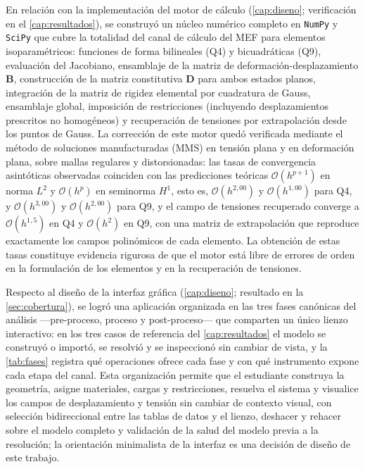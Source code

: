 En relación con la implementación del motor de cálculo (\autoref{cap:diseno}; verificación en el \autoref{cap:resultados}), se construyó un núcleo numérico completo en \texttt{NumPy} y \texttt{SciPy} que cubre la totalidad del canal de cálculo del MEF para elementos isoparamétricos: funciones de forma bilineales (Q4) y bicuadráticas (Q9), evaluación del Jacobiano, ensamblaje de la matriz de deformación-desplazamiento $\bm{B}$, construcción de la matriz constitutiva $\bm{D}$ para ambos estados planos, integración de la matriz de rigidez elemental por cuadratura de Gauss, ensamblaje global, imposición de restricciones (incluyendo desplazamientos prescritos no homogéneos) y recuperación de tensiones por extrapolación desde los puntos de Gauss. La corrección de este motor quedó verificada mediante el método de soluciones manufacturadas (MMS) en tensión plana y en deformación plana, sobre mallas regulares y distorsionadas: las tasas de convergencia asintóticas observadas coinciden con las predicciones teóricas $\mathcal{O}(h^{p+1})$ en norma $L^2$ y $\mathcal{O}(h^{p})$ en seminorma $H^1$, esto es, $\mathcal{O}(h^{2{,}00})$ y $\mathcal{O}(h^{1{,}00})$ para Q4, y $\mathcal{O}(h^{3{,}00})$ y $\mathcal{O}(h^{2{,}00})$ para Q9, y el campo de tensiones recuperado converge a $\mathcal{O}(h^{1{,}5})$ en Q4 y $\mathcal{O}(h^{2})$ en Q9, con una matriz de extrapolación que reproduce exactamente los campos polinómicos de cada elemento. La obtención de estas tasas constituye evidencia rigurosa de que el motor está libre de errores de orden en la formulación de los elementos y en la recuperación de tensiones.

Respecto al diseño de la interfaz gráfica (\autoref{cap:diseno}; resultado en la \autoref{sec:cobertura}), se logró una aplicación organizada en las tres fases canónicas del análisis —pre-proceso, proceso y post-proceso— que comparten un único lienzo interactivo: en los tres casos de referencia del \autoref{cap:resultados} el modelo se construyó o importó, se resolvió y se inspeccionó sin cambiar de vista, y la \autoref{tab:fases} registra qué operaciones ofrece cada fase y con qué instrumento expone cada etapa del canal. Esta organización permite que el estudiante construya la geometría, asigne materiales, cargas y restricciones, resuelva el sistema y visualice los campos de desplazamiento y tensión sin cambiar de contexto visual, con selección bidireccional entre las tablas de datos y el lienzo, deshacer y rehacer sobre el modelo completo y validación de la salud del modelo previa a la resolución; la orientación minimalista de la interfaz es una decisión de diseño de este trabajo.

